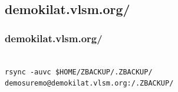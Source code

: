 \documentclass[xcolor=table, notheorems, hyperref={pdfpagelabels=false}]{beamer}
\begin{document}
\begin{frame}[fragile]
\section{demokilat.vlsm.org/}
\frametitle{demokilat.vlsm.org/}

\begin{lstlisting}[basicstyle=\ttfamily\large]

rsync -auvc $HOME/ZBACKUP/.ZBACKUP/ demosuremo@demokilat.vlsm.org:/.ZBACKUP/

\end{lstlisting}

\end{frame}

\end{document}
